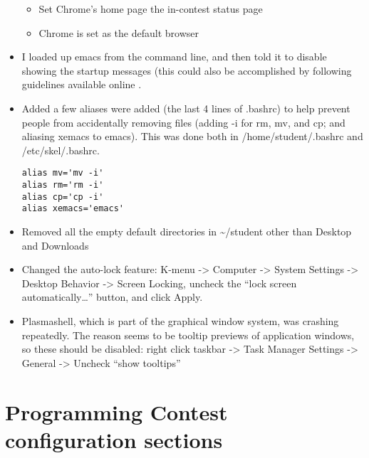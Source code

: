 \begin{itemize}
  \begin{itemize}
  \tightlist

  \item
    Set Chrome's home page the in-contest status page
  \item
    Chrome is set as the default browser
  \end{itemize}
\item
  I loaded up emacs from the command line, and then told it to disable
  showing the startup messages (this could also be accomplished by
  following guidelines available online
  .
\item
  Added a few aliases were added (the last 4 lines of .bashrc) to help
  prevent people from accidentally removing files (adding -i for rm, mv,
  and cp; and aliasing xemacs to emacs). This was done both in
  /home/student/.bashrc and /etc/skel/.bashrc.

\begin{verbatim}
alias mv='mv -i'
alias rm='rm -i'
alias cp='cp -i'
alias xemacs='emacs'
\end{verbatim}

\item
  Removed all the empty default directories in \textasciitilde{}/student
  other than Desktop and Downloads
\item
  Changed the auto-lock feature: K-menu -\textgreater{} Computer
  -\textgreater{} System Settings -\textgreater{} Desktop Behavior
  -\textgreater{} Screen Locking, uncheck the ``lock screen
  automatically\ldots{}'' button, and click Apply.
\item
  Plasmashell, which is part of the graphical window system, was
  crashing repeatedly. The reason seems to be tooltip previews of
  application windows, so these should be disabled: right click taskbar
  -\textgreater{} Task Manager Settings -\textgreater{} General
  -\textgreater{} Uncheck ``show tooltips''
\end{itemize}


\section{Programming Contest configuration
sections}\label{programming-contest-configuration-sections}


